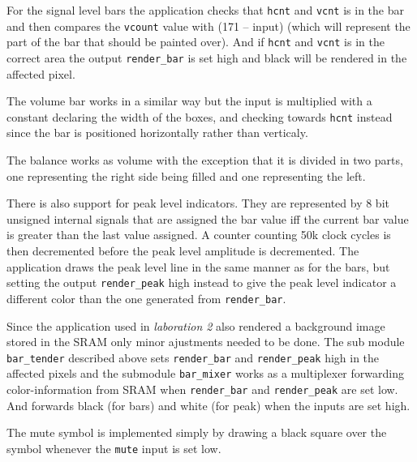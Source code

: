 For the signal level bars the application checks that \verb+hcnt+ and
\verb+vcnt+ is in the bar and then compares the \verb+vcount+ value with
(171 -- input)
(which will represent the part of the bar that should be
painted over). And if \verb+hcnt+ and \verb+vcnt+ is in the correct
area the output \verb+render_bar+ is set high and black will be rendered in
the affected pixel.

The volume bar works in a similar way but the input is multiplied with
a constant declaring the width of the boxes, and checking towards
\verb+hcnt+ instead since the bar is positioned horizontally rather
than verticaly.

The balance works as volume with the exception that it is divided in two
parts, one representing the right side being filled and one
representing the left.

There is also support for peak level indicators. They are represented
by 8 bit unsigned internal signals that are assigned the bar value iff
the current bar value is greater than the last value assigned. A
counter counting 50k clock cycles is then decremented before the peak
level amplitude is decremented. The application draws the peak level
line in the same manner as for the bars, but setting the output
\verb+render_peak+ high instead to give the peak level indicator a
different color than the one generated from \verb+render_bar+.

Since the application used in \emph{laboration 2} also rendered a background image
stored in the SRAM only minor ajustments needed to be done. The
sub module \verb+bar_tender+ described above sets \verb+render_bar+ and
\verb+render_peak+ high in the affected pixels and the submodule
\verb+bar_mixer+ works as a multiplexer forwarding color-information
from SRAM when \verb+render_bar+ and \verb+render_peak+ are set
low. And forwards black (for bars) and white (for peak) when the
inputs are set high.

The mute symbol is implemented simply by drawing a black square over
the symbol whenever the \verb+mute+ input is set low.
 
